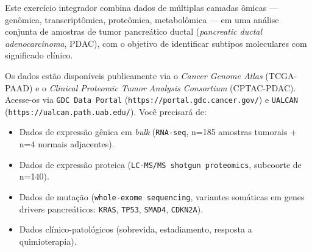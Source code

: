 \begin{exercicio}[$\star\star\star\star$] Este exercício integrador combina dados de múltiplas camadas ômicas --- genômica, transcriptômica, proteômica, metabolômica --- em uma análise conjunta de amostras de tumor pancreático ductal (\emph{pancreatic ductal adenocarcinoma}, PDAC), com o objetivo de identificar subtipos moleculares com significado clínico.

Os dados estão disponíveis publicamente via o \emph{Cancer Genome Atlas} (TCGA-PAAD) e o \emph{Clinical Proteomic Tumor Analysis Consortium} (CPTAC-PDAC). Acesse-os via \texttt{GDC Data Portal} (\texttt{https://portal.gdc.cancer.gov/}) e \texttt{UALCAN} (\texttt{https://ualcan.path.uab.edu/}). Você precisará de:
\begin{itemize}
  \item Dados de expressão gênica em \emph{bulk} (\texttt{RNA-seq}, n=185 amostras tumorais + n=4 normais adjacentes).
  \item Dados de expressão proteica (\texttt{LC-MS/MS shotgun proteomics}, subcoorte de n=140).
  \item Dados de mutação (\texttt{whole-exome sequencing}, variantes somáticas em genes drivers pancreáticos: \texttt{KRAS}, \texttt{TP53}, \texttt{SMAD4}, \texttt{CDKN2A}).
  \item Dados clínico-patológicos (sobrevida, estadiamento, resposta a quimioterapia).
\end{itemize}


\end{exercicio}
